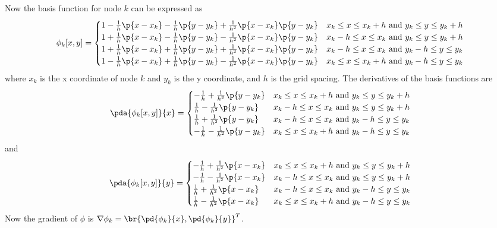 \documentclass[11pt, titlepage]{article}
\begin{document}
\begin{enumerate}
\begin{enumerate}
        Now the basis function for node $k$ can be expressed as
        \[
          \phi_k[x, y] =
          \begin{cases}
            1 - \frac{1}{h}\p{x - x_k} - \frac{1}{h}\p{y-y_k} + \frac{1}{h^2}\p{x - x_k}\p{y-y_k} & x_k \le x \le x_k + h \text{ and } y_k \le y \le y_k + h \\
            1 + \frac{1}{h}\p{x - x_k} - \frac{1}{h}\p{y-y_k} - \frac{1}{h^2}\p{x - x_k}\p{y-y_k} & x_k - h \le x \le x_k \text{ and } y_k \le y \le y_k + h \\
            1 + \frac{1}{h}\p{x - x_k} + \frac{1}{h}\p{y-y_k} + \frac{1}{h^2}\p{x - x_k}\p{y-y_k} & x_k - h \le x \le x_k \text{ and } y_k - h\le y \le y_k \\
            1 - \frac{1}{h}\p{x - x_k} + \frac{1}{h}\p{y-y_k} - \frac{1}{h^2}\p{x - x_k}\p{y-y_k} & x_k \le x \le x_k + h \text{ and } y_k - h\le y \le y_k
          \end{cases}
        \]
        where $x_k$ is the x coordinate of node $k$ and $y_k$ is the y
        coordinate, and $h$ is the grid spacing.
        The derivatives of the basis functions are
        \[
          \pda{\phi_k[x, y]}{x} =
          \begin{cases}
            -\frac{1}{h} + \frac{1}{h^2}\p{y-y_k} & x_k \le x \le x_k + h \text{ and } y_k \le y \le y_k + h \\
             \frac{1}{h} - \frac{1}{h^2}\p{y-y_k} & x_k - h \le x \le x_k \text{ and } y_k \le y \le y_k + h \\
             \frac{1}{h} + \frac{1}{h^2}\p{y-y_k} & x_k - h \le x \le x_k \text{ and } y_k - h\le y \le y_k \\
            -\frac{1}{h} - \frac{1}{h^2}\p{y-y_k} & x_k \le x \le x_k + h \text{ and } y_k - h\le y \le y_k
          \end{cases}
        \]
        and
        \[
          \pda{\phi_k[x, y]}{y} =
          \begin{cases}
            -\frac{1}{h} + \frac{1}{h^2}\p{x - x_k} & x_k \le x \le x_k + h \text{ and } y_k \le y \le y_k + h \\
            -\frac{1}{h} - \frac{1}{h^2}\p{x - x_k} & x_k - h \le x \le x_k \text{ and } y_k \le y \le y_k + h \\
             \frac{1}{h} + \frac{1}{h^2}\p{x - x_k} & x_k - h \le x \le x_k \text{ and } y_k - h\le y \le y_k \\
             \frac{1}{h} - \frac{1}{h^2}\p{x - x_k} & x_k \le x \le x_k + h \text{ and } y_k - h\le y \le y_k
          \end{cases}
        \]
        Now the gradient of $\phi$ is $\nabla \phi_k = \br{\pd{\phi_k}{x}, \pd{\phi_k}{y}}^T$.


\end{enumerate}
\end{enumerate}
\end{document}
